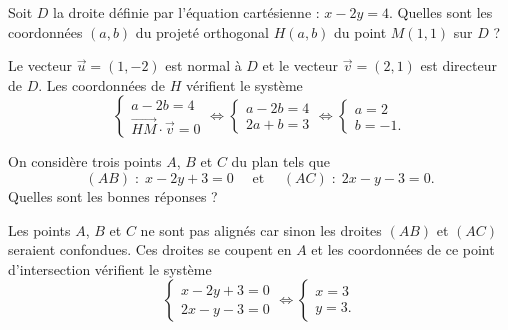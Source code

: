 \begin{question}

Soit $D$ la droite définie par l'équation cartésienne : $x-2y=4$. Quelles sont les coordonnées $(a,b)$ du projeté orthogonal $H(a,b)$ du point $M(1,1)$ sur $D$ ?
\begin{answers}  
\end{answers}
\begin{explanations}
Le vecteur $\vec{u}=(1,-2)$ est normal à $D$ et le vecteur $\vec{v}=(2,1)$ est directeur de $D$. Les coordonnées de $H$ vérifient le système
$$\left\{\begin{array}{l}a-2b=4\\ \overrightarrow{HM}\cdot\vec{v}=0
\end{array}\right. \Leftrightarrow \left\{\begin{array}{l}a-2b=4\\ 2a+b=3
\end{array}\right. \Leftrightarrow \left\{\begin{array}{l}a=2\\ b=-1.
\end{array}\right.$$
\end{explanations}
\end{question}



\begin{question}

On considère trois points $A$, $B$ et $C$ du plan tels que
$$(AB)\; : \; x-2y+3=0\quad \mbox{ et }\quad (AC)\; : \; 2x-y-3=0.$$
Quelles sont les bonnes réponses ?
\begin{answers}  
\end{answers}
\begin{explanations}
Les points $A$, $B$ et $C$ ne sont pas alignés car sinon les droites $(AB)$ et $(AC)$ seraient confondues. Ces droites se coupent en $A$ et les coordonnées de ce point d'intersection vérifient le système 
$$\left\{\begin{array}{l}x-2y+3=0\\ 2x-y-3=0
\end{array}\right. \Leftrightarrow \left\{\begin{array}{l}x=3\\ y=3.\end{array}\right.$$
\end{explanations}
\end{question}


